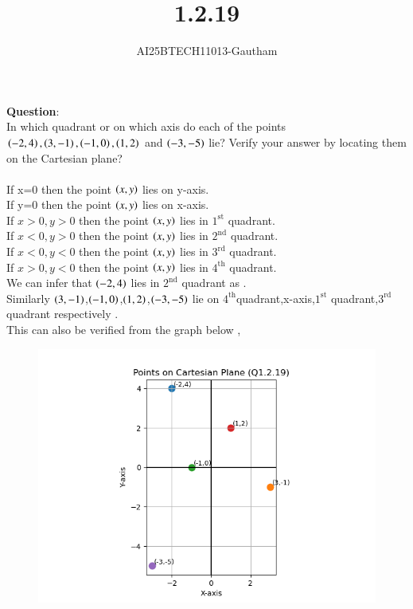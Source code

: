 \documentclass[journal]{IEEEtran}
\begin{document}

\vspace{3cm}

\title{1.2.19}
\author{AI25BTECH11013-Gautham}
 \maketitle
{\let\newpage\relax\maketitle}

\renewcommand{\thefigure}{\theenumi}
\renewcommand{\thetable}{\theenumi}
\setlength{\intextsep}{10pt} %


\renewcommand{\thetable}{\theenumi}                          
\textbf{Question}:\\
In which quadrant or on which axis do each of the points $\brak{-2,4},\brak{3,-1},\brak{-1,0},\brak{1,2}$ and $\brak{-3,-5}$ lie?       Verify your answer by locating them on the Cartesian plane?\\
\solution \\
If x=0 then the point $\brak{x,y}$ lies on y-axis.\\
If y=0 then the point $\brak{x,y}$ lies on x-axis.\\
If $x>0,y>0$ then the point $\brak{x,y}$ lies in $1^\text{st}$ quadrant.\\
If $x<0,y>0$ then the point $\brak{x,y}$ lies in $2^\text{nd}$ quadrant. \\
If $x<0,y<0$ then the point $\brak{x,y}$ lies in $3^\text{rd}$ quadrant. \\
If $x>0,y<0$ then the point $\brak{x,y}$ lies in $4^\text{th}$ quadrant. \\
We can infer that $\brak{-2,4}$ lies in $2^\text{nd}$ quadrant as . \\
Similarly $\brak{3,-1}$,$\brak{-1,0}$,$\brak{1,2}$,$\brak{-3,-5}$ lie on $4^\text{th}$quadrant,x-axis,$1^\text{st}$ quadrant,$3^\text{rd}$ quadrant respectively . \\
This can also be verified from the graph below ,
\begin{figure}[h!]
    \centering
    \includegraphics[height=0.6\textheight, keepaspectratio]{figs/Figure1.png}
    \label{figure_1}
\end{figure}
\end{document}
